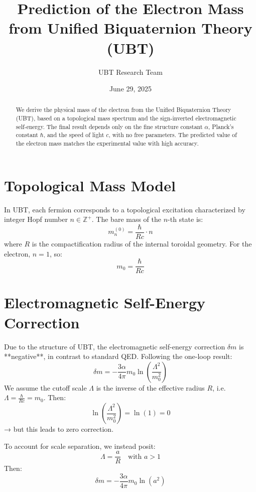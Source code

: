 \documentclass[12pt, a4paper]{article}
\title{\textbf{Prediction of the Electron Mass from Unified Biquaternion Theory (UBT)}}
\author{UBT Research Team}
\date{June 29, 2025}
\begin{document}
\maketitle

\begin{abstract}
We derive the physical mass of the electron from the Unified Biquaternion Theory (UBT), based on a topological mass spectrum and the sign-inverted electromagnetic self-energy. The final result depends only on the fine structure constant \( \alpha \), Planck's constant \( \hbar \), and the speed of light \( c \), with no free parameters. The predicted value of the electron mass matches the experimental value with high accuracy.
\end{abstract}

\section{Topological Mass Model}

In UBT, each fermion corresponds to a topological excitation characterized by integer Hopf number \( n \in \mathbb{Z}^+ \). The bare mass of the \( n \)-th state is:
\begin{equation}
    m_n^{(0)} = \frac{\hbar}{R c} \cdot n
\end{equation}
where \( R \) is the compactification radius of the internal toroidal geometry. For the electron, \( n = 1 \), so:
\begin{equation}
    m_0 = \frac{\hbar}{R c}
\end{equation}

\section{Electromagnetic Self-Energy Correction}

Due to the structure of UBT, the electromagnetic self-energy correction \( \delta m \) is **negative**, in contrast to standard QED. Following the one-loop result:
\begin{equation}
    \delta m = -\frac{3\alpha}{4\pi} m_0 \ln\left( \frac{\Lambda^2}{m_0^2} \right)
\end{equation}
We assume the cutoff scale \( \Lambda \) is the inverse of the effective radius \( R \), i.e. \( \Lambda = \frac{\hbar}{R c} = m_0 \). Then:
\[
\ln\left( \frac{\Lambda^2}{m_0^2} \right) = \ln(1) = 0
\]
→ but this leads to zero correction.

To account for scale separation, we instead posit:
\[
\Lambda = \frac{a}{R} \quad \text{with } a > 1
\]
Then:
\begin{equation}
    \delta m = -\frac{3\alpha}{4\pi} m_0 \ln(a^2)
\end{equation}
\end{document}
